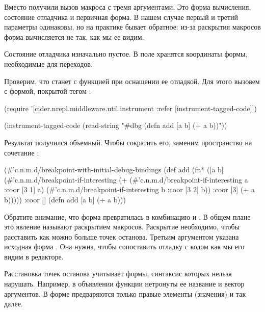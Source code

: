 Вместо  получили вызов макроса  с тремя аргументами. Это форма вычисления, состояние отладчика и первичная форма. В нашем случае первый и третий параметры одинаковы, но на практике бывает обратное: из-за раскрытия макросов форма вычисляется не так, как мы ее видим.

Состояние отладчика изначально пустое. В поле  хранятся координаты формы, необходимые для переходов.

Проверим, что станет с функцией при оснащении ее отладкой. Для этого вызовем  с формой, покрытой тегом :

\begin{english}
  \begin{clojure}
(require
 '[cider.nrepl.middleware.util.instrument :refer [instrument-tagged-code]])

(instrument-tagged-code
 (read-string "#dbg (defn add [a b] (+ a b))"))
  \end{clojure}
\end{english}

Результат получился объемный. Чтобы сократить его, заменим пространство  на сочетание :

\begin{english}
  \begin{clojure}
(#'c.n.m.d/breakpoint-with-initial-debug-bindings
 (def
  add
  (fn*
   ([a b]
    (#'c.n.m.d/breakpoint-if-interesting
     (+
      (#'c.n.m.d/breakpoint-if-interesting
       a
       {:coor [3 1]}
       a)
      (#'c.n.m.d/breakpoint-if-interesting
       b
       {:coor [3 2]}
       b))
     {:coor [3]}
     (+ a b)))))
 {:coor []}
 (defn add [a b] (+ a b)))
  \end{clojure}
\end{english}

Обратите внимание, что форма  превратилась в комбинацию  и . В общем плане это явление называют раскрытием макросов. Раскрытие необходимо, чтобы расставить как можно больше точек останова. Третьим аргументом указана исходная форма . Она нужна, чтобы сопоставить отладку с кодом как мы его видим в редакторе.

Расстановка точек останова учитывает формы, синтаксис которых нельзя нарушать. Например, в объявлении функции нетронуты ее название и вектор аргументов. В форме  предваряются только правые элементы (значения) и так далее.

